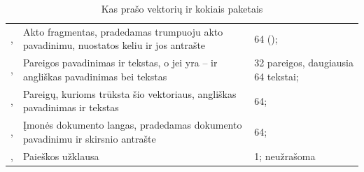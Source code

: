 \begin{table}[H]
\caption{Kas prašo vektorių ir kokiais paketais}\label{tab:models:embedcallers}
\begin{tabularx}{\textwidth}{@{}L{43mm}YL{40mm}@{}}
\toprule
{} &  &  \\
\midrule
{},  & Akto fragmentas, pradedamas trumpuoju akto pavadinimu, nuostatos keliu ir jos antrašte & 64 ();  \\
,  & Pareigos pavadinimas ir tekstas, o jei yra -- ir angliškas pavadinimas bei tekstas & 32 pareigos, daugiausia 64 tekstai;  \\
,  & Pareigų, kurioms trūksta šio vektoriaus, angliškas pavadinimas ir tekstas & 64;  \\
,  & Įmonės dokumento langas, pradedamas dokumento pavadinimu ir skirsnio antrašte & 64;  \\
,  & Paieškos užklausa & 1; neužrašoma \\
\bottomrule
\end{tabularx}
\end{table}

